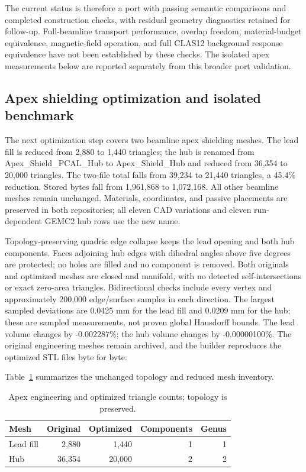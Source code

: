The current status is therefore a port with passing semantic comparisons and completed construction
checks, with residual geometry diagnostics retained for follow-up. Full-beamline transport performance,
overlap freedom, material-budget equivalence, magnetic-field operation, and full CLAS12 background
response equivalence have not been established by these checks. The isolated apex measurements below are
reported separately from this broader port validation.

\subsection{Apex shielding optimization and isolated benchmark}

The next optimization step covers two beamline apex shielding meshes. The lead fill is reduced from 2,880 to
1,440 triangles; the hub is renamed from Apex\_Shield\_PCAL\_Hub to Apex\_Shield\_Hub and reduced from
36,354 to 20,000 triangles. The two-file total falls from 39,234 to 21,440 triangles, a 45.4\% reduction.
Stored bytes fall from 1,961,868 to 1,072,168. All other beamline meshes remain unchanged. Materials,
coordinates, and passive placements are preserved in both repositories; all eleven CAD variations and eleven
run-dependent GEMC2 hub rows use the new name.

Topology-preserving quadric edge collapse keeps the lead opening and both hub components. Faces adjoining
hub edges with dihedral angles above five degrees are protected; no holes are filled and no component is
removed. Both originals and optimized meshes are closed and manifold, with no detected self-intersections or
exact zero-area triangles. Bidirectional checks include every vertex and approximately 200,000 edge/surface
samples in each direction. The largest sampled deviations are 0.0425 mm for the lead fill and 0.0209 mm for
the hub; these are sampled measurements, not proven global Hausdorff bounds. The lead volume changes by
-0.002287\%; the hub volume changes by -0.00000100\%. The original engineering meshes remain archived, and
the builder reproduces the optimized STL files byte for byte.

Table~\ref{tab:apex-meshes} summarizes the unchanged topology and reduced mesh inventory.

\begin{table}[htbp]
\centering
\caption{Apex engineering and optimized triangle counts; topology is preserved.}
\label{tab:apex-meshes}
\begin{tabular}{lrrrr}
\toprule
Mesh & Original & Optimized & Components & Genus \\
\midrule
Lead fill & 2,880 & 1,440 & 1 & 1 \\
Hub & 36,354 & 20,000 & 2 & 2 \\
\bottomrule
\end{tabular}
\end{table}

